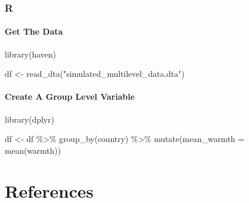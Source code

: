 \documentclass[
  letterpaper,
  DIV=11,
  numbers=noendperiod]{scrreprt}
\newenvironment{Shaded}{\begin{snugshade}}{\end{snugshade}}
\newcommand{\AttributeTok}[1]{\textcolor[rgb]{0.40,0.45,0.13}{#1}}
\newcommand{\FunctionTok}[1]{\textcolor[rgb]{0.28,0.35,0.67}{#1}}
\newcommand{\NormalTok}[1]{\textcolor[rgb]{0.00,0.23,0.31}{#1}}
\newcommand{\OtherTok}[1]{\textcolor[rgb]{0.00,0.23,0.31}{#1}}
\newcommand{\SpecialCharTok}[1]{\textcolor[rgb]{0.37,0.37,0.37}{#1}}
\newcommand{\StringTok}[1]{\textcolor[rgb]{0.13,0.47,0.30}{#1}}
\begin{document}
\subsection{R}

\subsubsection{Get The Data}\label{get-the-data-15}

\begin{Shaded}
\begin{Highlighting}[]
\FunctionTok{library}\NormalTok{(haven)}

\NormalTok{df }\OtherTok{\textless{}{-}} \FunctionTok{read\_dta}\NormalTok{(}\StringTok{"simulated\_multilevel\_data.dta"}\NormalTok{)}
\end{Highlighting}
\end{Shaded}

\subsubsection{Create A Group Level
Variable}\label{create-a-group-level-variable-1}

\begin{Shaded}
\begin{Highlighting}[]
\FunctionTok{library}\NormalTok{(dplyr) }

\NormalTok{df }\OtherTok{\textless{}{-}}\NormalTok{ df }\SpecialCharTok{\%\textgreater{}\%} 
  \FunctionTok{group\_by}\NormalTok{(country) }\SpecialCharTok{\%\textgreater{}\%}
  \FunctionTok{mutate}\NormalTok{(}\AttributeTok{mean\_warmth =} \FunctionTok{mean}\NormalTok{(warmth))}
\end{Highlighting}
\end{Shaded}


\chapter*{References}\label{references}

\end{document}
